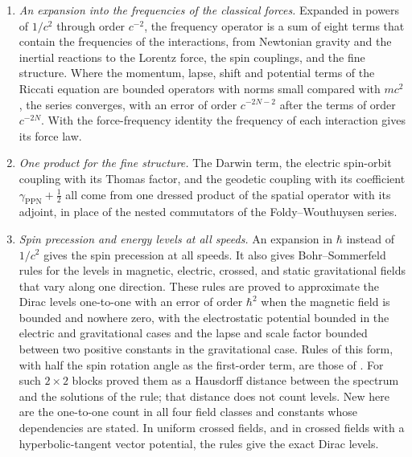 \documentclass[aps,prd,onecolumn,tightenlines,nofootinbib,notitlepage,11pt,floatfix]{revtex4-2}
\theoremstyle{indentedtheorem}
\begin{document}
\begin{enumerate}[label=(\roman*)]
\item \emph{An expansion into the frequencies of the classical forces.} Expanded in powers of $1/c^2$ through order $c^{-2}$, the frequency operator is a sum of eight terms that contain the frequencies of the interactions, from Newtonian gravity and the inertial reactions to the Lorentz force, the spin couplings, and the fine structure. Where the momentum, lapse, shift and potential terms of the Riccati equation are bounded operators with norms small compared with $mc^2$, the series converges, with an error of order $c^{-2N-2}$ after the terms of order $c^{-2N}$. With the force-frequency identity the frequency of each interaction gives its force law.
\item \emph{One product for the fine structure.} The Darwin term, the electric spin-orbit coupling with its Thomas factor, and the geodetic coupling with its coefficient $\gamma_\text{PPN}+\tfrac{1}{2}$ all come from one dressed product of the spatial operator with its adjoint, in place of the nested commutators of the Foldy--Wouthuysen series.
\item \emph{Spin precession and energy levels at all speeds.} An expansion in $\hbar$ instead of $1/c^2$ gives the spin precession at all speeds. It also gives Bohr--Sommerfeld rules for the levels in magnetic, electric, crossed, and static gravitational fields that vary along one direction. These rules are proved to approximate the Dirac levels one-to-one with an error of order $\hbar^2$ when the magnetic field is bounded and nowhere zero, with the electrostatic potential bounded in the electric and gravitational cases and the lapse and scale factor bounded between two positive constants in the gravitational case. Rules of this form, with half the spin rotation angle as the first-order term, are those of \citet{Keppeler2003Semiclassical}. For such $2\times2$ blocks \citet{BeckerFujiieWittsten2025Bohr} proved them as a Hausdorff distance between the spectrum and the solutions of the rule; that distance does not count levels. New here are the one-to-one count in all four field classes and constants whose dependencies are stated. In uniform crossed fields, and in crossed fields with a hyperbolic-tangent vector potential, the rules give the exact Dirac levels.

\end{enumerate}
\end{document}
